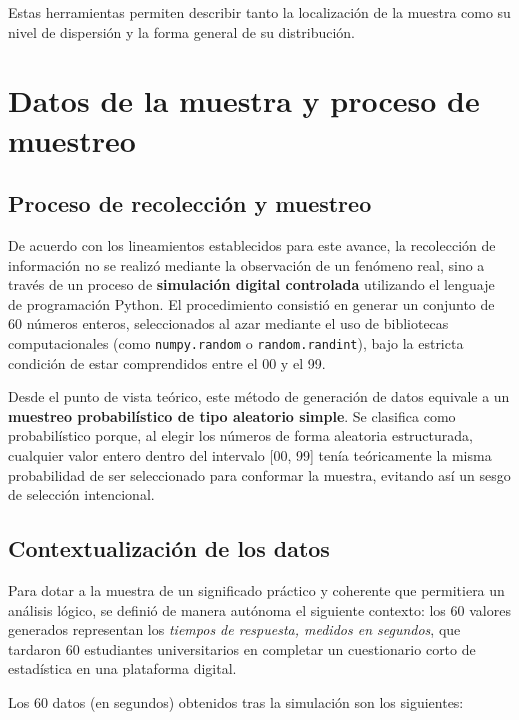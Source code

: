 \documentclass[12pt,letterpaper]{article}
\begin{document}
Estas herramientas permiten describir tanto la localización de la muestra como su nivel de dispersión y la forma general de su distribución.

\section{Datos de la muestra y proceso de muestreo}

\subsection{Proceso de recolección y muestreo}

De acuerdo con los lineamientos establecidos para este avance, la recolección de información no se realizó mediante la observación de un fenómeno real, sino a través de un proceso de \textbf{simulación digital controlada} utilizando el lenguaje de programación Python. El procedimiento consistió en generar un conjunto de 60 números enteros, seleccionados al azar mediante el uso de bibliotecas computacionales (como \texttt{numpy.random} o \texttt{random.randint}), bajo la estricta condición de estar comprendidos entre el 00 y el 99. 

Desde el punto de vista teórico, este método de generación de datos equivale a un \textbf{muestreo probabilístico de tipo aleatorio simple}. Se clasifica como probabilístico porque, al elegir los números de forma aleatoria estructurada, cualquier valor entero dentro del intervalo [00, 99] tenía teóricamente la misma probabilidad de ser seleccionado para conformar la muestra, evitando así un sesgo de selección intencional.

\subsection{Contextualización de los datos}

Para dotar a la muestra de un significado práctico y coherente que permitiera un análisis lógico, se definió de manera autónoma el siguiente contexto: los 60 valores generados representan los \textit{tiempos de respuesta, medidos en segundos}, que tardaron 60 estudiantes universitarios en completar un cuestionario corto de estadística en una plataforma digital.

Los 60 datos (en segundos) obtenidos tras la simulación son los siguientes:
\end{document}
